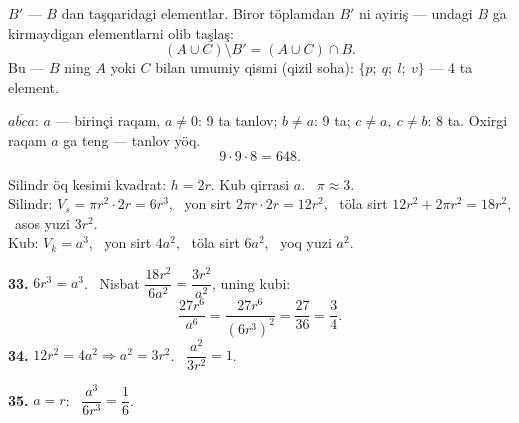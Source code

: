$B'$ — $B$ dan taşqaridagi elementlar. Biror töplamdan $B'$ ni ayiriş — undagi $B$ ga kirmaydigan elementlarni olib taşlaş:
\[(A\cup C)\setminus B'=(A\cup C)\cap B.\]
Bu — $B$ ning $A$ yoki $C$ bilan umumiy qismi (\textcolor{aux}{qizil} soha): $\{p;\ q;\ l;\ v\}$ — 4 ta element.

$\overline{abca}$: $a$ — birinçi raqam, $a\ne0$: 9 ta tanlov; $b\ne a$: 9 ta; $c\ne a,\ c\ne b$: 8 ta. Oxirgi raqam $a$ ga teng — tanlov yöq.
\[9\cdot9\cdot8=648.\]

\newpage
{}
Silindr öq kesimi kvadrat: $h=2r$. Kub qirrasi $a$. \ $\pi\approx3$.\\
Silindr: $V_s=\pi r^2\cdot2r=6r^3$, \ yon sirt $2\pi r\cdot2r=12r^2$, \ töla sirt $12r^2+2\pi r^2=18r^2$, \ asos yuzi $3r^2$.\\
Kub: $V_k=a^3$, \ yon sirt $4a^2$, \ töla sirt $6a^2$, \ yoq yuzi $a^2$.

\textbf{33.} $6r^3=a^3$. \ Nisbat $\dfrac{18r^2}{6a^2}=\dfrac{3r^2}{a^2}$, uning kubi:
\[\frac{27r^6}{a^6}=\frac{27r^6}{(6r^3)^2}=\frac{27}{36}=\frac34.\]
\textbf{34.} $12r^2=4a^2\Rightarrow a^2=3r^2$. \ $\dfrac{a^2}{3r^2}=1$.

\textbf{35.} $a=r$: \ $\dfrac{a^3}{6r^3}=\dfrac16$.

